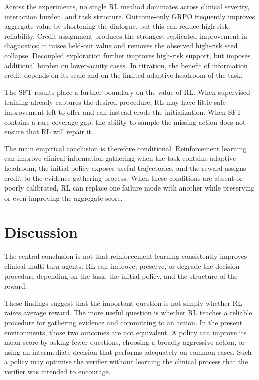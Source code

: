 \documentclass{article}
\begin{document}
Across the experiments, no single RL method dominates across clinical severity,
interaction burden, and task structure. Outcome-only GRPO frequently improves
aggregate value by shortening the dialogue, but this can reduce high-risk
reliability. Credit assignment produces the strongest replicated improvement in
diagnostics; it raises held-out value and removes the observed high-risk seed
collapse. Decoupled exploration further improves high-risk support, but imposes
additional burden on lower-acuity cases. In titration, the benefit of information
credit depends on its scale and on the limited adaptive headroom of the task.

The SFT results place a further boundary on the value of RL. When supervised
training already captures the desired procedure, RL may have little safe
improvement left to offer and can instead erode the initialization. When SFT
contains a rare coverage gap, the ability to sample the missing action does not
ensure that RL will repair it.

The main empirical conclusion is therefore conditional. Reinforcement learning
can improve clinical information gathering when the task contains adaptive
headroom, the initial policy exposes useful trajectories, and the reward assigns
credit to the evidence gathering process. When these conditions are absent or
poorly calibrated, RL can replace one failure mode with another while preserving
or even improving the aggregate score.

\FloatBarrier
\section{Discussion}
\label{sec:discussion}

The central conclusion is not that reinforcement learning consistently improves
clinical multi-turn agents. RL can improve, preserve, or degrade the decision
procedure depending on the task, the initial policy, and the structure of the
reward.

These findings suggest that the important question is not simply whether RL
raises average reward. The more useful question is whether RL teaches a reliable
procedure for gathering evidence and committing to an action. In the present
environments, those two outcomes are not equivalent. A policy can improve its
mean score by asking fewer questions, choosing a broadly aggressive action, or
using an intermediate decision that performs adequately on common cases. Such a
policy may optimise the verifier without learning the clinical process that the
verifier was intended to encourage.
\end{document}
